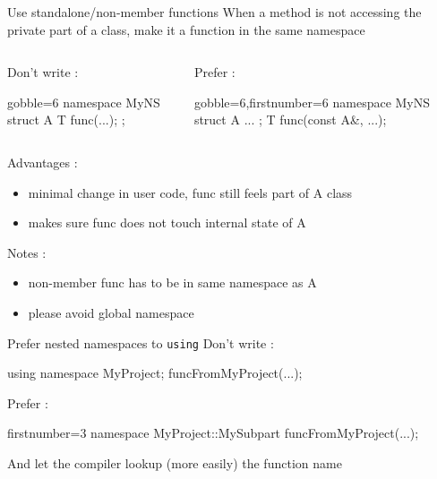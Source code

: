 \begin{frame}[fragile]
  \begin{block}{Use standalone/non-member functions}
    When a method is not accessing the private part of a class, make it a function in the same namespace
    \vspace{-1mm}
    \begin{columns}[T]
      \begin{column}{.35\textwidth}
        Don't write :
        \vspace{-1mm}
        \begin{cppcode*}{gobble=6}
          namespace MyNS {
            struct A {
              T func(...);
            };
          }
        \end{cppcode*}
      \end{column}
      \begin{column}{.35\textwidth}
        Prefer :
        \vspace{-1mm}
        \begin{cppcode*}{gobble=6,firstnumber=6}
          namespace MyNS {
            struct A { ... };
            T func(const A&, ...);
          }
        \end{cppcode*}
      \end{column}
    \end{columns}
    \vspace{.2cm}
    Advantages :
    \begin{itemize}
    \item minimal change in user code, func still feels part of A class
    \item makes sure func does not touch internal state of A
    \end{itemize}
    Notes :
    \begin{itemize}
    \item non-member func has to be in same namespace as A
    \item please avoid global namespace
    \end{itemize}
  \end{block}
\end{frame}

\begin{frame}[fragile]
  \begin{block}{Prefer nested namespaces to \texttt{using}}
    Don't write :
    \begin{cppcode}
      using namespace MyProject;
      funcFromMyProject(...);
    \end{cppcode}
    Prefer :
    \begin{cppcode*}{firstnumber=3}
      namespace MyProject::MySubpart {
        funcFromMyProject(...);
      }
    \end{cppcode*}
    And let the compiler lookup (more easily) the function name
  \end{block}
\end{frame}

